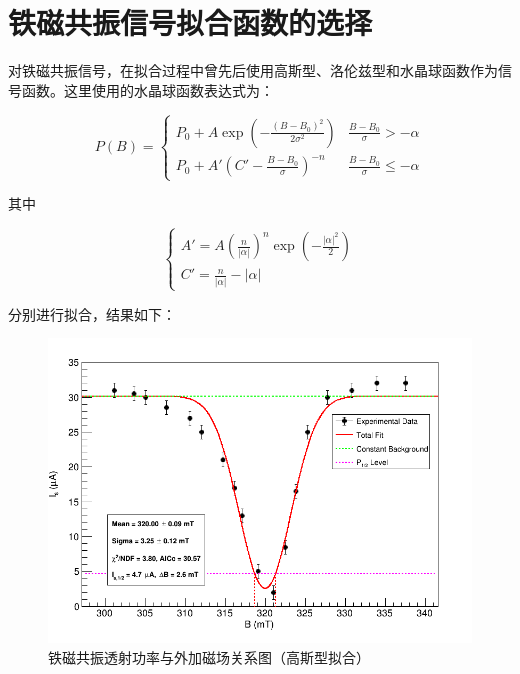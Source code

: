\documentclass{thuemp}
\begin{document}
    \section{铁磁共振信号拟合函数的选择}
    
    对铁磁共振信号，在拟合过程中曾先后使用高斯型、洛伦兹型和水晶球函数作为信号函数。这里使用的水晶球函数表达式为：
    
        
    
    \begin{equation}
        P(B) = 
        \begin{cases}
            P_0 + A \exp\left( -\frac{(B - B_0)^2}{2\sigma^2} \right) & \frac{B - B_0}{\sigma} > -\alpha \\
            P_0 + A' \left( C' -\frac{B-B_0}{\sigma} \right)^{-n} & \frac{B - B_0}{\sigma} \leq -\alpha
        \end{cases}
        \label{eq:crystalball}
    \end{equation}
    
    其中
    
    \begin{equation}
        \begin{cases}
            A' = A \left( \frac n {|\alpha|}\right)^n \exp \left(-\frac{|\alpha|^2} 2\right) \\
        C' = \frac n {|\alpha|} - |\alpha|
        \end{cases}
    \end{equation}

    分别进行拟合，结果如下：

    \begin{figure}[H]
        \centering
        \includegraphics[width=0.9\linewidth]{../Data/FMR_ConstantBg_GaussPeak.png}
        \caption{铁磁共振透射功率与外加磁场关系图（高斯型拟合）} \label{fig:FMR_Gauss}
    \end{figure}
\end{document}
